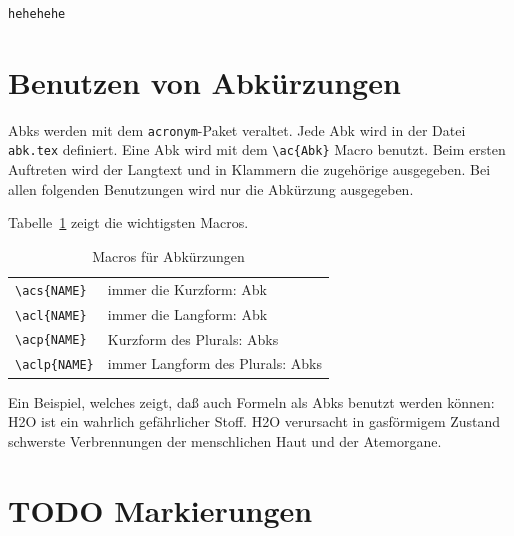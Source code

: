 \begin{lstlisting}[language=java,         % Welche Sprache, see listings-Dokumentation
				style=algoBericht,     % Benutze oben definierten Stil
				label={algo-quicksort}, % Label für \ref{..}
				basicstyle=\tiny\sffamily,
				captionpos=b,
				caption={Der Algo hehehhe}]
					hehehehe
\end{lstlisting}	%

\section{Benutzen von Abkürzungen}

\acp{Abk} %
werden mit dem \verb+acronym+-Paket veraltet.
Jede
\ac{Abk} %
wird in der Datei \texttt{abk.tex} definiert.
Eine \ac{Abk} wird mit dem \verb+\ac{Abk}+  Macro benutzt. Beim ersten Auftreten
wird der Langtext und in Klammern die zugehörige  ausgegeben. Bei allen
folgenden Benutzungen wird nur die Abkürzung ausgegeben.

Tabelle~\ref{acronym-macros} zeigt die wichtigsten Macros.
\begin{table}[ht]
\begin{center}
\begin{tabular}{|ll|}\hline
\verb+\acs{NAME}+  & immer die Kurzform: \acs{Abk}		\\
\verb+\acl{NAME}+  & immer die Langform: \acl{Abk}		\\
\verb+\acp{NAME}+  & Kurzform des Plurals: \acp{Abk}		\\
\verb+\aclp{NAME}+ & immer Langform des Plurals: \aclp{Abk}	\\\hline
\end{tabular}
\end{center}
\caption{\label{acronym-macros}Macros für Abkürzungen}
\end{table}

Ein Beispiel, welches zeigt, daß auch Formeln als \acp{Abk} benutzt werden können:\\
\ac{H2O} ist ein wahrlich gefährlicher Stoff. \ac{H2O} verursacht in gasförmigem
Zustand schwerste Verbrennungen der menschlichen Haut und der Atemorgane.


\section{TODO Markierungen}


